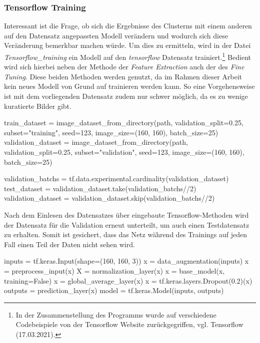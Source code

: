 \documentclass[a4paper,12pt,ngerman]{article}
\begin{document}
\subsubsection{Tensorflow Training}

Interessant ist die Frage, ob sich die Ergebnisse des Clusterns mit einem anderen auf den Datensatz angepassten Modell verändern und wodurch sich diese Veränderung bemerkbar machen würde. Um dies zu ermitteln, wird in der Datei \textit{Tensorflow\_training} ein Modell auf den \textit{tensorflow} Datensatz trainiert.\footnote{In der Zusammenstellung des Programms wurde auf verschiedene Codebeispiele von der Tensorflow Website zurückgegriffen, vgl. Tensorflow (17.03.2021).} Bedient wird sich hierbei neben der Methode der \textit{Feature Extraction} auch der des \textit{Fine Tuning}. Diese beiden Methoden werden genutzt, da im Rahmen dieser Arbeit kein neues Modell von Grund auf trainieren werden kann. So eine Vorgehensweise ist mit dem vorliegenden Datensatz zudem nur schwer möglich, da es zu wenige kuratierte Bilder gibt. \\

\begin{python}
	train_dataset = image_dataset_from_directory(path, validation_split=0.25, subset="training", seed=123, image_size=(160, 160), batch_size=25)
	validation_dataset = image_dataset_from_directory(path, validation_split=0.25, subset="validation", seed=123, image_size=(160, 160), batch_size=25)

	validation_batchs = tf.data.experimental.cardinality(validation_dataset)
	test_dataset = validation_dataset.take(validation_batchs//2)
	validation_dataset = validation_dataset.skip(validation_batchs//2)
\end{python}

Nach dem Einlesen des Datensatzes über eingebaute Tensorflow-Methoden wird der Datensatz für die Validation erneut unterteilt, um auch einen Testdatensatz zu erhalten. Somit ist gesichert, dass das Netz während des Trainings auf jeden Fall einen Teil der Daten nicht sehen wird. \\

\begin{python}
	inputs = tf.keras.Input(shape=(160, 160, 3))
	x = data_augmentation(inputs)
	x = preprocess_input(x)
	X = normalization_layer(x)
	x = base_model(x, training=False)
	x = global_average_layer(x)
	x = tf.keras.layers.Dropout(0.2)(x)
	outputs = prediction_layer(x)
	model = tf.keras.Model(inputs, outputs)
\end{python}
\end{document}
